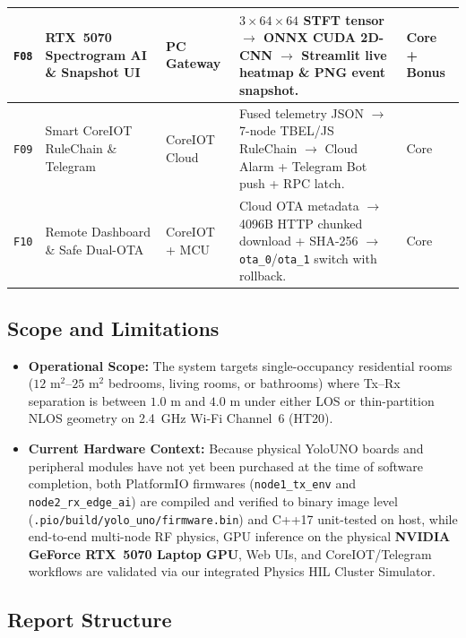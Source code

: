 \documentclass{hcmut-report}
\begin{document}
\begin{table}[htbp]
\begin{tabularx}{\textwidth}{|C{0.9cm}|P{3.6cm}|P{2.2cm}|Y|C{1.4cm}|}
\hline
\texttt{F08} & RTX~5070 Spectrogram AI \& Snapshot UI & PC Gateway & $3\times 64\times 64$ STFT tensor $\rightarrow$ ONNX CUDA 2D-CNN $\rightarrow$ Streamlit live heatmap \& PNG event snapshot. & Core + Bonus \\
\hline
\texttt{F09} & Smart CoreIOT RuleChain \& Telegram & CoreIOT Cloud & Fused telemetry JSON $\rightarrow$ 7-node TBEL/JS RuleChain $\rightarrow$ Cloud Alarm + Telegram Bot push + RPC latch. & Core \\
\hline
\texttt{F10} & Remote Dashboard \& Safe Dual-OTA & CoreIOT + MCU & Cloud OTA metadata $\rightarrow$ 4096B HTTP chunked download + SHA-256 $\rightarrow$ \texttt{ota\_0}/\texttt{ota\_1} switch with rollback. & Core \\
\hline
\end{tabularx}
\end{table}

\subsection[Scope and Limitations]{Scope and Limitations}
\label{sec:scope}

\begin{itemize}
  \item \textbf{Operational Scope:} The system targets single-occupancy residential rooms ($12\text{ m}^2$--$25\text{ m}^2$ bedrooms, living rooms, or bathrooms) where Tx--Rx separation is between $1.0\text{ m}$ and $4.0\text{ m}$ under either LOS or thin-partition NLOS geometry on 2.4~GHz Wi-Fi Channel~6 (HT20).
  \item \textbf{Current Hardware Context:} Because physical YoloUNO boards and peripheral modules have not yet been purchased at the time of software completion, both PlatformIO firmwares (\texttt{node1\_tx\_env} and \texttt{node2\_rx\_edge\_ai}) are compiled and verified to binary image level (\texttt{.pio/build/yolo\_uno/firmware.bin}) and C++17 unit-tested on host, while end-to-end multi-node RF physics, GPU inference on the physical \textbf{NVIDIA GeForce RTX~5070 Laptop GPU}, Web UIs, and CoreIOT/Telegram workflows are validated via our integrated Physics HIL Cluster Simulator.
\end{itemize}

\subsection[Report Structure]{Report Structure}
\label{sec:structure}
\end{document}
